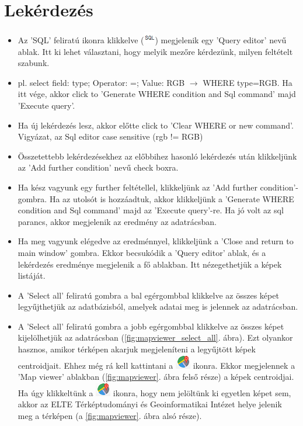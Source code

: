 \documentclass[a4paper,12pt]{book}
\begin{document}
\section{Lekérdezés}

\begin{itemize}
	\item  Az 'SQL' feliratú ikonra klikkelve (\includegraphics[width=0.5cm]{sql.png}) megjelenik egy 'Query editor' nevű ablak. Itt ki lehet választani, hogy melyik mezőre kérdezünk, milyen feltételt szabunk.
	
	\item pl. select field: type;  Operator: =; Value: RGB $\rightarrow$ 
	WHERE type=RGB. Ha itt vége, akkor click to 'Generate WHERE condition and Sql command' majd 'Execute query'. 
	
	\item Ha új lekérdezés lesz, akkor előtte click to 'Clear WHERE or new command'. Vigyázat, az Sql editor case sensitive (rgb !=  RGB)
	
	\item Összetettebb lekérdezésekhez az előbbihez hasonló lekérdezés után klikkeljünk az 'Add further condition' nevű check boxra. 
	
	\item Ha kész vagyunk egy further feltétellel, klikkeljünk az 'Add further condition'- gombra. Ha az utolsót is hozzáadtuk, akkor klikkeljünk a 'Generate WHERE condition and Sql command' majd az 'Execute query'-re. Ha jó volt az sql parancs, akkor megjelenik az eredmény az adatrácsban.
	
	\item Ha meg vagyunk elégedve az eredménnyel, klikkeljünk a 'Close and return to main window' gombra. Ekkor becsukódik a 'Query editor' ablak, és a lekérdezés eredménye megjelenik a fő ablakban. Itt nézegethetjük a képek listáját.
	
	\item A 'Select all' feliratú gombra a bal egérgombbal klikkelve az összes képet legyűjthetjük az adatbázisból, amelyek adatai meg is jelennek az adatrácsban.
	
	\item A 'Select all' feliratú gombra a jobb egérgombbal klikkelve az összes képet kijelölhetjük az  adatrácsban (\ref{fig:mapviewer_select_all}. ábra). Ezt olyankor hasznos, amikor térképen akarjuk megjeleníteni a legyűjtött képek centroidjait. Ehhez még rá kell kattintani a \includegraphics[width = 0.5 cm]{mapviewer_ikon.png} ikonra. Ekkor megjelennek a 'Map viewer' ablakban (\ref{fig:mapviewer}. ábra felső része) a képek centroidjai. Ha úgy klikkeltünk a \includegraphics[width = 0.5 cm]{mapviewer_ikon.png} ikonra, hogy nem jelöltünk ki egyetlen képet sem, akkor az ELTE Térképtudományi és Geoinformatikai Intézet helye jelenik meg a térképen (a \ref{fig:mapviewer}. ábra alsó része).
	

\end{itemize}
\end{document}
